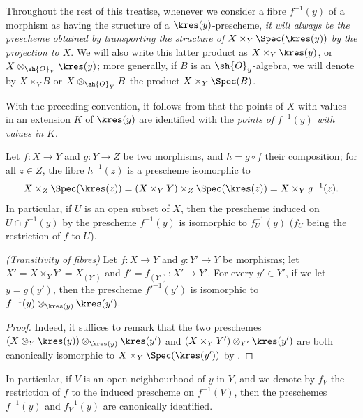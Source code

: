 \begin{env}[3.6.2]
\label{I.3.6.2}
Throughout the rest of this treatise, whenever we consider a fibre $f^{-1}(y)$ of a morphism as having the structure of a $\kres(y)$-prescheme, \emph{it will always be the prescheme obtained by transporting the structure of $X\times_Y\Spec(\kres(y))$ by the projection to $X$}.
We will also write this latter product as $X\times_Y\kres(y)$, or $X\otimes_{\sh{O}_Y}\kres(y)$; more generally, if $B$ is an $\sh{O}_y$-algebra, we will denote by $X\times_Y B$ or $X\otimes_{\sh{O}_Y}B$ the product $X\times_Y\Spec(B)$.
\end{env}

With the preceding convention, it follows from  that the points of $X$ with values in an extension $K$ of $\kres(y)$ are identified with the \emph{points of $f^{-1}(y)$ with values in $K$}.

\begin{env}[3.6.3]
\label{I.3.6.3}
Let $f:X\to Y$ and $g:Y\to Z$ be two morphisms, and $h=g\circ f$ their composition; for all $z\in Z$, the fibre $h^{-1}(z)$ is a prescheme isomorphic to
\[
  X\times_Z\Spec(\kres(z))=(X\times_Y Y)\times_Z\Spec(\kres(z))=X\times_Y g^{-1}(z).
\]
In particular, if $U$ is an open subset of $X$, then the prescheme induced on $U\cap f^{-1}(y)$ by the prescheme $f^{-1}(y)$ is isomorphic to $f^{-1}_U(y)$ ($f_U$ being the restriction of $f$ to $U$).
\end{env}

\begin{proposition}[3.6.4]
\label{I.3.6.4}
\emph{(Transitivity of fibres)}
Let $f:X\to Y$ and $g:Y'\to Y$ be morphisms; let $X'=X\times_Y Y'=X_{(Y')}$ and $f'=f_{(Y')}:X'\to Y'$.
For every $y'\in Y'$, if we let $y=g(y')$, then the prescheme $f'^{-1}(y')$ is isomorphic to $f^{-1}(y)\otimes_{\kres(y)}\kres(y')$.
\end{proposition}

\begin{proof}
Indeed, it suffices to remark that the two preschemes $(X\otimes_Y\kres(y))\otimes_{\kres(y)}\kres(y')$ and $(X\times_Y Y')\otimes_{Y'}\kres(y')$ are both canonically isomorphic to $X\times_Y\Spec(\kres(y'))$ by .
\end{proof}

In particular, if $V$ is an open neighbourhood of $y$ in $Y$, and we denote by $f_V$ the restriction of $f$ to the induced prescheme on $f^{-1}(V)$, then the preschemes $f^{-1}(y)$ and $f^{-1}_V(y)$ are canonically identified.

